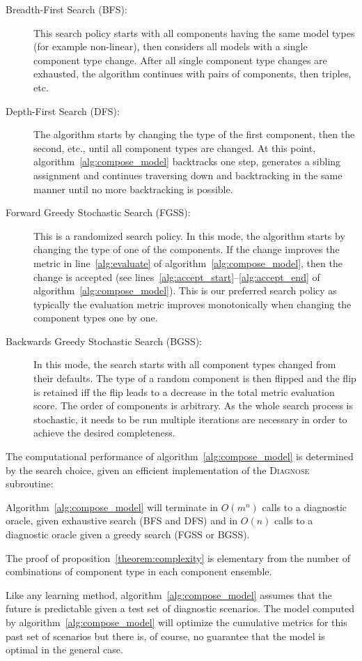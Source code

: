 \begin{description}
%
\item[Breadth-First Search (BFS):]
{
%
This search policy starts with all components having the same model
types (for example non-linear), then considers all models with a
single component type change. After all single component type changes
are exhausted, the algorithm continues with pairs of components,
then triples, etc.
%
}
\item[Depth-First Search (DFS):]
{
%
The algorithm starts by changing the type of the first component, then
the second, etc., until all component types are changed. At this
point, algorithm~\ref{alg:compose_model} backtracks one step,
generates a sibling assignment and continues traversing down and
backtracking in the same manner until no more backtracking is
possible.
%
}
\item[Forward Greedy Stochastic Search (FGSS):]
{
%
This is a randomized search policy. In this mode, the algorithm starts
by changing the type of one of the components. If the change improves
the metric in line~\ref{alg:evaluate} of
algorithm~\ref{alg:compose_model}, then the change is accepted (see
lines~\ref{alg:accept_start}--\ref{alg:accept_end} of
algorithm~\ref{alg:compose_model}). This is our preferred search
policy as typically the evaluation metric improves monotonically when
changing the component types one by one.
%
}
\item[Backwards Greedy Stochastic Search (BGSS):]
{
%
In this mode, the search starts with all component types changed from
their defaults. The type of a random component is then flipped and the
flip is retained iff the flip leads to a decrease in the total metric
evaluation score. The order of components is arbitrary. As the whole
search process is stochastic, it needs to be run multiple iterations
are necessary in order to achieve the desired completeness.
%
}
%
\end{description}
\par
The computational performance of algorithm~\ref{alg:compose_model} is
determined by the search choice, given an efficient implementation of
the \textsc{Diagnose} subroutine:
%
\begin{proposition}\label{theorem:complexity}
%
Algorithm~\ref{alg:compose_model} will terminate in $O(m^n)$ calls to
a diagnostic oracle, given exhaustive search (BFS and DFS) and in
$O(n)$ calls to a diagnostic oracle given a greedy search (FGSS or
BGSS).
%
\end{proposition}
%
The proof of proposition~\ref{theorem:complexity} is elementary from
the number of combinations of component type in each component
ensemble.
\par
Like any learning method, algorithm~\ref{alg:compose_model} assumes
that the future is predictable given a test set of diagnostic
scenarios. The model computed by algorithm~\ref{alg:compose_model}
will optimize the cumulative metrics for this past set of scenarios
but there is, of course, no guarantee that the model is optimal in the
general case.
